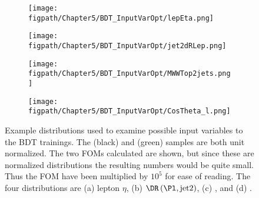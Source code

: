 \begin{figure}[!hbt]
    \centering
    \begin{subfigure}[t]{0.48\textwidth}
        \texttt{[image: \\figpath/Chapter5/BDT\_InputVarOpt/lepEta.png]}
        \caption{}
        \label{fig:BDT_FOM_lepEta}
    \end{subfigure}
    \begin{subfigure}[t]{0.48\textwidth}
        \texttt{[image: \\figpath/Chapter5/BDT\_InputVarOpt/jet2dRLep.png]}
        \caption{}
        \label{fig:BDT_FOM_DeltaRLepJet}
    \end{subfigure}

    \begin{subfigure}[t]{0.48\textwidth}
        \texttt{[image: \\figpath/Chapter5/BDT\_InputVarOpt/MWWTop2jets.png]}
        \caption{}
        \label{fig:BDT_FOM_Mlvjj}
    \end{subfigure}
    \begin{subfigure}[t]{0.48\textwidth}
        \texttt{[image: \\figpath/Chapter5/BDT\_InputVarOpt/CosTheta\_l.png]}
        \caption{}
        \label{fig:BDT_FOM_CosThetaL}
    \end{subfigure}
    \caption{Example distributions used to examine possible input variables to the BDT trainings. The \ggH (black) and \Wjets (green) samples are both unit normalized. The two FOMs calculated are shown, but since these are normalized distributions the resulting numbers would be quite small. Thus the FOM have been multiplied by $10^{5}$ for ease of reading. The four distributions are (a) lepton $\eta$, (b) $\DR\left(\Pl,\text{jet2}\right)$, (c) \Mlvjj, and (d) \costhetal.}
    \label{fig:BDT_FOM}
\end{figure}


